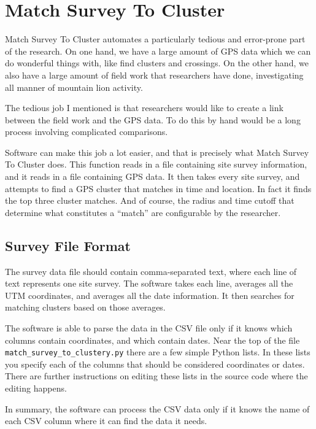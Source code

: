 \chapter{Match Survey To Cluster}
\hypertarget{match-survey-to-cluster}{}

Match Survey To Cluster automates a particularly tedious and
error-prone part of the research. On one hand, we have a large amount
of GPS data which we can do wonderful things with, like find clusters
and crossings. On the other hand, we also have a large amount of field
work that researchers have done, investigating all manner of mountain
lion activity.

The tedious job I mentioned is that researchers would like to create a
link between the field work and the GPS data. To do this by hand would
be a long process involving complicated comparisons.

Software can make this job a lot easier, and that is precisely what
Match Survey To Cluster does. This function reads in a file containing
site survey information, and it reads in a file containing GPS data.
It then takes every site survey, and attempts to find a GPS cluster
that matches in time and location. In fact it finds the top three
cluster matches. And of course, the radius and time cutoff that
determine what constitutes a ``match'' are configurable by the
researcher.

\section{Survey File Format}

The survey data file should contain comma-separated text, where each
line of text represents one site survey. The software takes each line,
averages all the UTM coordinates, and averages all the date
information. It then searches for matching clusters based on those
averages.

The software is able to parse the data in the CSV file only if it
knows which columns contain coordinates, and which contain dates. Near
the top of the file \texttt{match\_survey\_to\_clustery.py} there are a few
simple Python lists. In these lists you specify each of the columns
that should be considered coordinates or dates. There are further
instructions on editing these lists in the source code where the
editing happens.

In summary, the software can process the CSV data only if it knows the
name of each CSV column where it can find the data it needs.

